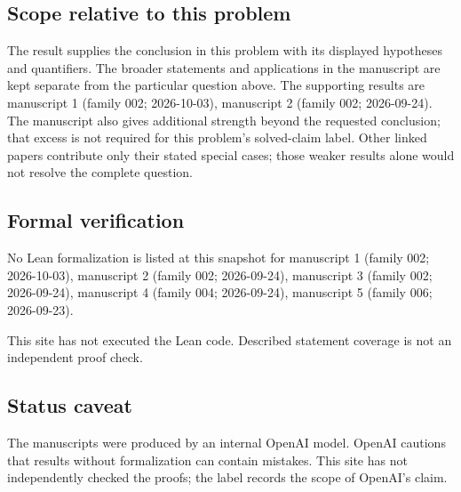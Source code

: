 \documentclass[11pt]{article}
\begin{document}
\subsection{Scope relative to this problem}
The result supplies the conclusion in this problem with its displayed hypotheses and quantifiers. The broader statements and applications in the manuscript are kept separate from the particular question above. The supporting results are manuscript 1 (family 002; 2026-10-03), manuscript 2 (family 002; 2026-09-24). The manuscript also gives additional strength beyond the requested conclusion; that excess is not required for this problem's solved-claim label. Other linked papers contribute only their stated special cases; those weaker results alone would not resolve the complete question.

\subsection{Formal verification}
No Lean formalization is listed at this snapshot for manuscript 1 (family 002; 2026-10-03), manuscript 2 (family 002; 2026-09-24), manuscript 3 (family 002; 2026-09-24), manuscript 4 (family 004; 2026-09-24), manuscript 5 (family 006; 2026-09-23).

This site has not executed the Lean code. Described statement coverage is not an independent proof check.

\subsection{Status caveat}
The manuscripts were produced by an internal OpenAI model. OpenAI cautions that results without formalization can contain mistakes. This site has not independently checked the proofs; the label records the scope of OpenAI's claim.
\end{document}
